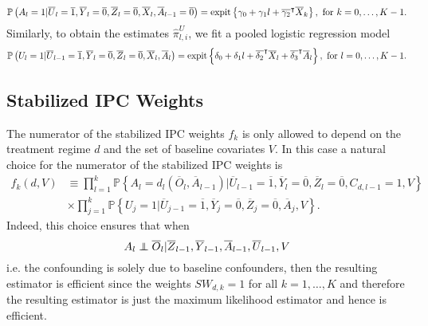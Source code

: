 \documentclass[12pt]{article}
\begin{document}
\begin{equation*}
\mathbb{P} \left( A_l = 1 \vert \overline{U}_{l} = \overline{1}, \overline{Y}_l = \overline{0}, \overline{Z}_l = \overline{0}, \overline{X}_l,  \overline{A}_{l-1} = \overline{0} \right) = \text{expit} \left\lbrace \gamma_0 + \gamma_1 l + \overline{\gamma_2}^\intercal \overline{X}_k \right\rbrace, \text{ for } k = 0, \dots, K-1.
\end{equation*}
Similarly,  to obtain the estimates $\hat{\pi}^U_{l,i}$,  we fit a pooled logistic regression model
\begin{equation*}
\mathbb{P} \left( U_l = 1 \vert \overline{U}_{l-1} = \overline{1}, \overline{Y}_{l} = \overline{0}, \overline{Z}_{l} = \overline{0}, \overline{X}_{l}, \overline{A}_{l} \right) = \text{expit} \left\lbrace \delta_0 + \delta_1 l + \overline{\delta_2}^\intercal \overline{X}_{l} + \overline{\delta_3}^\intercal \overline{A}_{l} \right\rbrace, \text{ for } l = 0, \dots, K-1.
\end{equation*}

\subsection{Stabilized IPC Weights}

The numerator of the stabilized IPC weights $f_{k}$ is only allowed to depend on the treatment regime $d$ and the set of baseline covariates $V$. In this case a natural choice for the numerator of the stabilized IPC weights is 
\begin{align*}
f_{k} \left( d, V \right) &\equiv \prod_{l=1}^{k} \mathbb{P} \left\lbrace A_{l} = d_l \left( \overline{O}_{l}, \overline{A}_{l-1} \right) \vert \overline{U}_{l-1} = \overline{1}, \overline{Y}_{l} = \overline{0}, \overline{Z}_{l} = \overline{0}, C_{d,l-1} = 1, V \right\rbrace \\
&\times \prod_{j=1}^{k} \mathbb{P} \left\lbrace U_{j} = 1 \vert \overline{U}_{j-1} = \overline{1}, \overline{Y}_{j} = \overline{0}, \overline{Z}_{j} = \overline{0}, \overline{A}_{j}, V \right\rbrace.
\end{align*}
Indeed, this choice ensures that when
\begin{equation*}
A_l \perp\!\!\!\!\perp \overline{O}_l \vert \overline{Z}_{l-1}, \overline{Y}_{l-1}, \overline{A}_{l-1}, \overline{U}_{l-1}, V
\end{equation*}
i.e. the confounding is solely due to baseline confounders, then the resulting estimator is efficient since the weights $SW_{d,k} = 1$ for all $k = 1, \dots, K$ and therefore the resulting estimator is just the maximum likelihood estimator and hence is efficient.
\end{document}
